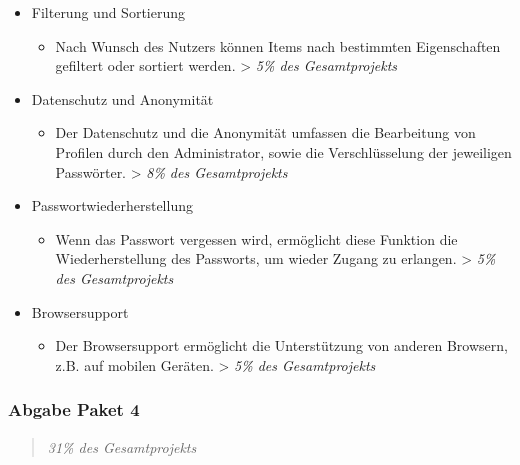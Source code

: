 \begin{itemize}
\itemsep1pt\parskip0pt
\item
  Filterung und Sortierung

  \begin{itemize}
  \itemsep1pt\parskip0pt
  \item
    Nach Wunsch des Nutzers können Items nach bestimmten Eigenschaften gefiltert oder sortiert werden.
     \textgreater{} \emph{5\% des
    Gesamtprojekts}
  \end{itemize}
\item
  Datenschutz und Anonymität

  \begin{itemize}
  \itemsep1pt\parskip0pt
  \item
    Der Datenschutz und die Anonymität umfassen die Bearbeitung von
    Profilen durch den Administrator, sowie die Verschlüsselung der
    jeweiligen Passwörter. \textgreater{} \emph{8\% des Gesamtprojekts}
  \end{itemize}
\item
  Passwortwiederherstellung

  \begin{itemize}
  \itemsep1pt\parskip0pt
  \item
    Wenn das Passwort vergessen wird, ermöglicht diese Funktion die Wiederherstellung des Passworts, um wieder Zugang zu erlangen.
    \textgreater{} \emph{5\% des Gesamtprojekts}
  \end{itemize}
\item
  Browsersupport

  \begin{itemize}
  \itemsep1pt\parskip0pt
  \item
    Der Browsersupport ermöglicht die Unterstützung von anderen Browsern, z.B. auf mobilen
    Geräten. \textgreater{} \emph{5\% des Gesamtprojekts}
  \end{itemize}
\end{itemize}

\subsubsection{Abgabe Paket 4}\label{abgabe-paket-4}

\begin{quote}
\emph{31\% des Gesamtprojekts}
\end{quote}

